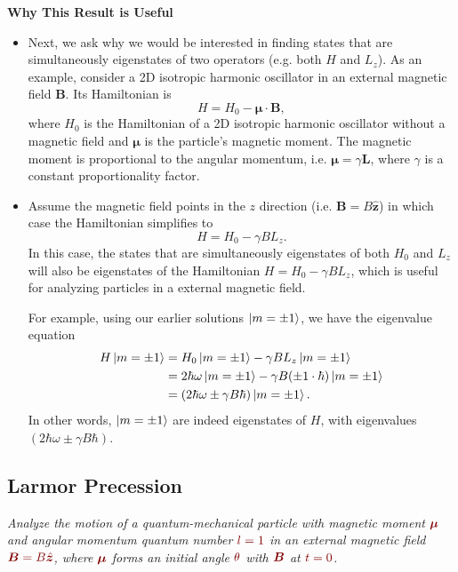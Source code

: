 \documentclass[11pt, a4paper]{article}
\newcommand{\dmath}[1]{\textcolor{Maroon}{#1}}  %
\renewcommand{\vec}[1]{\bm{#1}} %
\newcommand{\uvec}[1]{\hat{\vec{#1}}} %
\begin{document}
\textbf{Why This Result is Useful}\\
\begin{itemize}
	\item Next, we ask why we would be interested in finding states that are simultaneously eigenstates of two operators (e.g. both $ H $ and $ L_{z} $). As an example, consider a 2D isotropic harmonic oscillator in an external magnetic field $ \vec{B} $. Its Hamiltonian is
	\begin{equation*}
		H = H_{0} - \vec{\mu} \cdot \vec{B},
	\end{equation*}
	where $ H_{0} $ is the Hamiltonian of a 2D isotropic harmonic oscillator without a magnetic field and $ \vec{\mu} $ is the particle's magnetic moment. The magnetic moment is proportional to the angular momentum, i.e. $ \vec{\mu} = \gamma \vec{L} $, where $ \gamma $ is a constant proportionality factor.
	
	\item Assume the magnetic field points in the $ z $ direction (i.e. $ \vec{B} = B \uvec{z} $) in which case the Hamiltonian simplifies to
	\begin{equation*}
		H = H_{0} - \gamma B L_{z}.
	\end{equation*}
	In this case, the states that are simultaneously eigenstates of both $ H_{0} $ and $ L_{z} $ will also be eigenstates of the Hamiltonian $ H = H_{0} - \gamma B L_{z}$, which is useful for analyzing particles in  a external magnetic field. 
	
	For example, using our earlier solutions $ \ket{m = \pm 1} $, we have the eigenvalue equation
	\begin{align*}
		H \ket{m = \pm 1} &= H_{0}\ket{m = \pm 1} - \gamma B L_{z} \ket{m = \pm 1} \\
		& = 2\hbar \omega \ket{m = \pm 1} - \gamma B (\pm 1 \cdot \hbar)\ket{m = \pm 1} \\
		&= (2\hbar \omega \pm \gamma B\hbar)\ket{m = \pm 1}.
	\end{align*}
	In other words, $ \ket{m = \pm 1} $ are indeed eigenstates of $ H $, with eigenvalues $ (2\hbar \omega \pm \gamma B\hbar) $.
\end{itemize}


\subsection{Larmor Precession}
\textit{Analyze the motion of a quantum-mechanical particle with magnetic moment $ \dmath{\vec{\mu}} $ and angular momentum quantum number $ \dmath{l = 1} $ in an external magnetic field $ \dmath{\vec{B} = B\uvec{z}} $, where $ \dmath{\vec{\mu}} $ forms an initial angle $ \dmath{\theta} $ with $ \dmath{\vec{B}} $ at $ \dmath{t = 0} $.}
\end{document}
